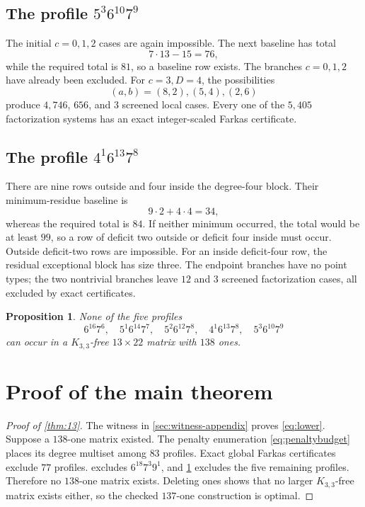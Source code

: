 \documentclass[11pt]{amsart}
\newtheorem{proposition}[theorem]{Proposition}
\begin{document}
\subsection{The profile $5^3 6^{10}7^9$}
The initial $c=0,1,2$ cases are again impossible. The next baseline has total
\[
 7\cdot13-15=76,
\]
while the required total is $81$, so a baseline row exists. The branches $c=0,1,2$ have already been excluded. For $c=3,D=4$, the possibilities
\[
 (a,b)=(8,2),(5,4),(2,6)
\]
produce $4{,}746$, $656$, and $3$ screened local cases. Every one of the $5{,}405$ factorization systems has an exact integer-scaled Farkas certificate.

\subsection{The profile $4^1 6^{13}7^8$}
There are nine rows outside and four inside the degree-four block. Their minimum-residue baseline is
\[
 9\cdot2+4\cdot4=34,
\]
whereas the required total is $84$. If neither minimum occurred, the total would be at least $99$, so a row of deficit two outside or deficit four inside must occur. Outside deficit-two rows are impossible. For an inside deficit-four row, the residual exceptional block has size three. The endpoint branches have no point types; the two nontrivial branches leave $12$ and $3$ screened factorization cases, all excluded by exact certificates.

\begin{proposition}\label{prop:five}
None of the five profiles
\[
6^{16}7^6,
\quad5^1 6^{14}7^7,
\quad5^2 6^{12}7^8,
\quad4^1 6^{13}7^8,
\quad5^3 6^{10}7^9
\]
can occur in a $K_{3,3}$-free $13\times22$ matrix with $138$ ones.
\end{proposition}

\section{Proof of the main theorem}
\begin{proof}[Proof of \cref{thm:13}]
The witness in \cref{sec:witness-appendix} proves \eqref{eq:lower}. Suppose a $138$-one matrix existed. The penalty enumeration \eqref{eq:penaltybudget} places its degree multiset among $83$ profiles. Exact global Farkas certificates exclude $77$ profiles.  excludes $6^{18}7^3 9^1$, and \cref{prop:five} excludes the five remaining profiles. Therefore no $138$-one matrix exists. Deleting ones shows that no larger $K_{3,3}$-free matrix exists either, so the checked $137$-one construction is optimal.
\end{proof}
\end{document}
